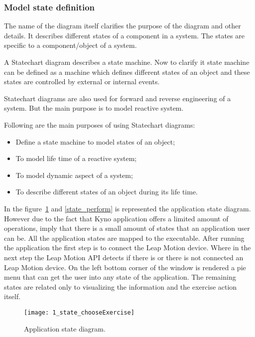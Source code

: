 \subsubsection{Model state definition}
The name of the diagram itself clarifies the purpose of the diagram and other details. It describes different states of a component in a system. The states are specific to a component/object of a system.

A Statechart diagram describes a state machine. Now to clarify it state machine can be defined as a machine which defines different states of an object and these states are controlled by external or internal events.

Statechart diagrams are also used for forward and reverse engineering of a system. But the main purpose is to model reactive system.


Following are the main purposes of using Statechart diagrams:

\begin{itemize}
\item Define a state machine to model states of an object;
\item To model life time of a reactive system;
\item To model dynamic aspect of a system;
\item To describe different states of an object during its life time.
\end{itemize}

\vspace{0.2cm}

In the  \mbox{figure \ref{state_choose}} and  \mbox{\ref{state_perform}} is represented the application state diagram.
 However due to the fact that Kyno application offers a limited amount of operations, imply that there is a small amount of states that an application user can be. All the application states are mapped to the executable. After running the application the first step is to connect the Leap Motion device. Where in the next step the Leap Motion API detects if there is or there is not connected an Leap Motion device. On the left bottom corner of the window is rendered a pie menu that can get the user into any state of the application. The remaining states are related only to visualizing the information and the exercise action itself.


\begin{figure}[!h]
\centering
\texttt{[image: 1\_state\_chooseExercise]}
\caption{Application state diagram.}\label{state_choose}
\end{figure}


